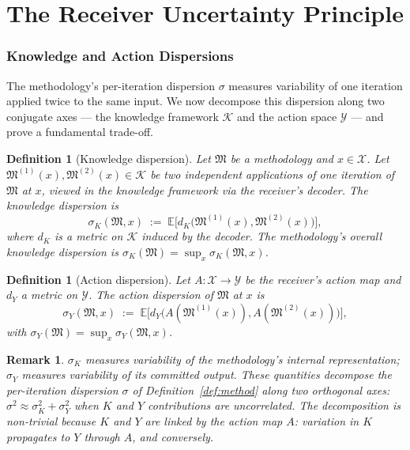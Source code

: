 \documentclass[11pt,a4paper]{article}
\newtheorem{definition}[theorem]{Definition}
\newtheorem{remark}[theorem]{Remark}
\newcommand{\Cands}{\mathcal{X}}
\newcommand{\Action}{\mathcal{Y}}
\newcommand{\Knowl}{\mathcal{K}}
\newcommand{\Method}{\mathfrak{M}}
\newcommand{\disp}{\sigma}
\begin{document}
\part{The Receiver Uncertainty Principle}

\section{Knowledge and Action Dispersions}
\label{sec:dispersions}

The methodology's per-iteration dispersion $\disp$ measures variability of one iteration applied twice to the same input. We now decompose this dispersion along two conjugate axes — the knowledge framework $\Knowl$ and the action space $\Action$ — and prove a fundamental trade-off.

\begin{definition}[Knowledge dispersion]
\label{def:dispK}
Let $\Method$ be a methodology and $x \in \Cands$. Let $\Method^{(1)}(x), \Method^{(2)}(x) \in \Knowl$ be two independent applications of one iteration of $\Method$ at $x$, viewed in the knowledge framework via the receiver's decoder. The \emph{knowledge dispersion} is
\[
\disp_K(\Method, x) \;:=\; \mathbb{E}\bigl[d_K\bigl(\Method^{(1)}(x), \Method^{(2)}(x)\bigr)\bigr],
\]
where $d_K$ is a metric on $\Knowl$ induced by the decoder. The methodology's overall knowledge dispersion is $\disp_K(\Method) = \sup_x \disp_K(\Method, x)$.
\end{definition}

\begin{definition}[Action dispersion]
\label{def:dispY}
Let $A : \Cands \to \Action$ be the receiver's action map and $d_Y$ a metric on $\Action$. The \emph{action dispersion} of $\Method$ at $x$ is
\[
\disp_Y(\Method, x) \;:=\; \mathbb{E}\bigl[d_Y\bigl(A(\Method^{(1)}(x)), A(\Method^{(2)}(x))\bigr)\bigr],
\]
with $\disp_Y(\Method) = \sup_x \disp_Y(\Method, x)$.
\end{definition}

\begin{remark}
\label{rem:disp-conjugate}
$\disp_K$ measures variability of the methodology's internal representation; $\disp_Y$ measures variability of its committed output. These quantities decompose the per-iteration dispersion $\disp$ of Definition~\ref{def:method} along two orthogonal axes: $\disp^2 \approx \disp_K^2 + \disp_Y^2$ when $K$ and $Y$ contributions are uncorrelated. The decomposition is non-trivial because $K$ and $Y$ are linked by the action map $A$: variation in $K$ propagates to $Y$ through $A$, and conversely.
\end{remark}
\end{document}
